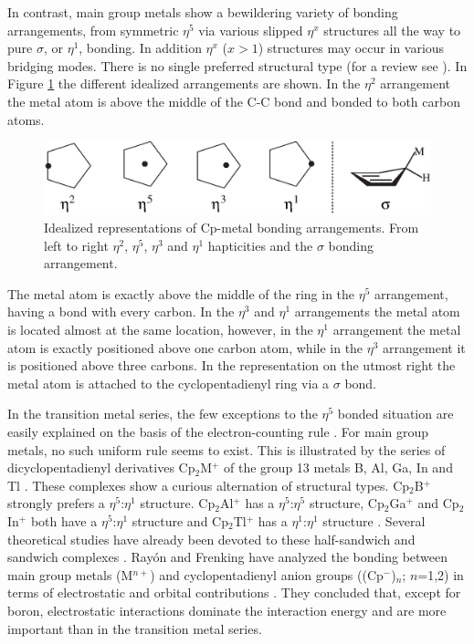 In contrast, main group metals show a bewildering variety of bonding arrangements, from symmetric $\eta^{5}$ via various slipped $\eta^{x}$ structures all the way to pure $\sigma$, or $\eta^{1}$, bonding. In addition $\eta^{x}$ ($x>1$) structures may occur in various bridging modes. There is no single preferred structural type (for a review see \cite{jutzi}). In Figure \ref{ch4.fig.bondarr} the different idealized arrangements are shown. In the $\eta^2$ arrangement the metal atom is above the middle of the C-C bond and bonded to both carbon atoms.
\begin{figure}[ht]
\center
\includegraphics[scale=0.8]{cyclopentadienyl/figures/bondarrangements.eps}
\caption{Idealized representations of Cp-metal bonding arrangements. From left to right $\eta^2$, $\eta^5$, $\eta^3$ and $\eta^1$ hapticities and the $\sigma$ bonding arrangement.}
\label{ch4.fig.bondarr}
\end{figure}
The metal atom is exactly above the middle of the ring in the $\eta^5$ arrangement, having a bond with every carbon. In the $\eta^3$ and $\eta^1$ arrangements the metal atom is located almost at the same location, however, in the $\eta^1$ arrangement the metal atom is exactly positioned above one carbon atom, while in the $\eta^3$ arrangement it is positioned above three carbons. In the representation on the utmost right the metal atom is attached to the cyclopentadienyl ring via a $\sigma$ bond. 

In the transition metal series, the few exceptions to the $\eta^{5}$ bonded situation are easily explained on the basis of the electron-counting rule \cite{shriver}.
For main group metals, no such uniform rule seems to exist. This is illustrated by the series of dicyclopentadienyl derivatives Cp$_2$M$^{+}$ of the group 13 metals B, Al, Ga, In and Tl \cite{macdonald}. These complexes show a curious alternation of structural types. Cp$_2$B$^{+}$ strongly prefers a $\eta^{5}$:$\eta^{1}$ structure. Cp$_2$Al$^{+}$ has a $\eta^{5}$:$\eta^{5}$ structure, Cp$_2$Ga$^{+}$ and Cp$_2$In$^{+}$ both have a $\eta^{5}$:$\eta^{1}$ structure and Cp$_2$Tl$^{+}$ has a $\eta^{1}$:$\eta^{1}$ structure \cite{budzelaar}.
%
%
Several theoretical studies have already been devoted to these half-sandwich and sandwich complexes \cite{kwon}. Ray\'{o}n and Frenking have analyzed the bonding between main group metals (M$^{n+}$) and cyclopentadienyl anion groups ((Cp$^{-}$)$_n$; $n$=1,2) in terms of electrostatic and orbital contributions \cite{rayon}. They concluded that, except for boron, electrostatic interactions dominate the interaction energy and are more important than in the transition metal series.

